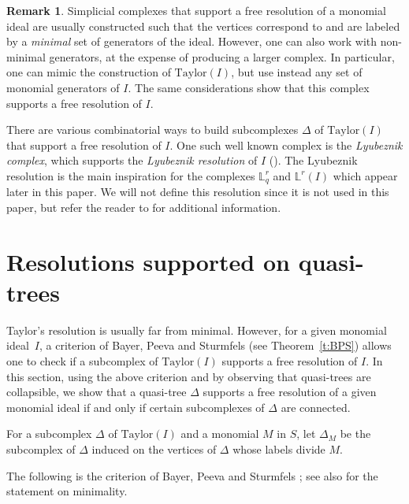 \documentclass[11pt]{article}
\theoremstyle{definition}
\newtheorem{rema}[theo]{Remark}
\numberwithin{equation}{section}
\newcommand{\Taylor}{\mathrm{Taylor}}
\newcommand{\D}{\Delta}
\newcommand{\Lrq}{\mathbb{L}^r_q}
\newcommand{\Lr}{\mathbb{L}^r}
\begin{document}
\begin{rema} \label{r:larger-Taylor}
Simplicial complexes that support a
free resolution of a monomial ideal are usually constructed such that the
vertices correspond to and are labeled by a {\it minimal} set of
generators of the ideal. However, one can also work with non-minimal
generators, at the expense of producing a larger complex. In
particular, one can mimic the construction of $\Taylor(I)$, but use
instead any set of monomial generators of $I$. The same
considerations show that this complex supports a free resolution of
$I$.
\end{rema}

There are various combinatorial ways to build subcomplexes
        $\D$ of $\Taylor(I)$ that support a free resolution of
        $I$. One such well known complex is the {\it Lyubeznik
          complex}, which supports the {\it Lyubeznik resolution} of
        $I$ \textup{(}\cite{L}\textup{)}. The Lyubeznik resolution is the main
        inspiration for the complexes $\Lrq$ and $\Lr(I)$ which appear
        later in this paper.  We will not define this resolution since
        it is not used in this paper, but refer the reader to \cite{L,M}
        for additional information.


\section{Resolutions supported on quasi-trees}
\label{sec:res-by-qtrees}

 Taylor's resolution is usually far from
        minimal. However, for a given monomial ideal~$I$, a
        criterion of Bayer, Peeva and Sturmfels \textup{(}see Theorem~\ref{t:BPS}\textup{)}
        allows one to check if a subcomplex of $\Taylor(I)$ supports a
        free resolution of $I$. In this section, using the above
        criterion and by observing that quasi-trees are collapsible,
        we show that a quasi-tree $\D$ supports a free resolution
        of a given monomial ideal if and only if certain subcomplexes
        of $\D$ are connected.

        For a subcomplex $\D$ of $\Taylor(I)$ and a
        monomial $M$ in $S$, let $\D_M$ be the subcomplex of $\D$
        induced on the vertices of $\D$ whose labels divide $M$.

        The following is the criterion of Bayer, Peeva and Sturmfels
        \cite[Lemma 2.2]{BPS}; see also \cite[Theorem 2.2]{E} for the
        statement on minimality.
\end{document}

